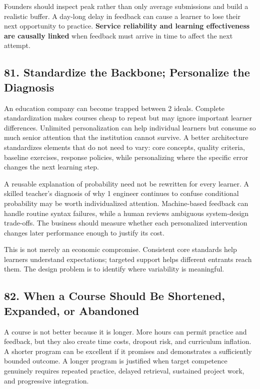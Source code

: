 Founders should inspect peak rather than only average submissions and build a realistic buffer. A day-long delay in feedback can cause a learner to lose their next opportunity to practice. \textbf{Service reliability and learning effectiveness are causally linked} when feedback must arrive in time to affect the next attempt.

\subsection*{81. Standardize the Backbone; Personalize the Diagnosis}

An education company can become trapped between 2 ideals. Complete standardization makes courses cheap to repeat but may ignore important learner differences. Unlimited personalization can help individual learners but consume so much senior attention that the institution cannot survive. A better architecture standardizes elements that do not need to vary: core concepts, quality criteria, baseline exercises, response policies, while personalizing where the specific error changes the next learning step.

A reusable explanation of probability need not be rewritten for every learner. A skilled teacher's diagnosis of why 1 engineer continues to confuse conditional probability may be worth individualized attention. Machine-based feedback can handle routine syntax failures, while a human reviews ambiguous system-design trade-offs. The business should measure whether each personalized intervention changes later performance enough to justify its cost.

This is not merely an economic compromise. Consistent core standards help learners understand expectations; targeted support helps different entrants reach them. The design problem is to identify where variability is meaningful.

\subsection*{82. When a Course Should Be Shortened, Expanded, or Abandoned}

A course is not better because it is longer. More hours can permit practice and feedback, but they also create time costs, dropout risk, and curriculum inflation. A shorter program can be excellent if it promises and demonstrates a sufficiently bounded outcome. A longer program is justified when target competence genuinely requires repeated practice, delayed retrieval, sustained project work, and progressive integration.

